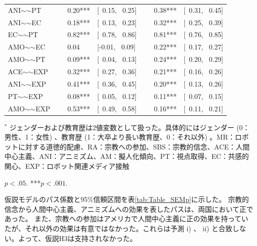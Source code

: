 \documentclass[a4j,12pt]{jreport}
\begin{document}
\begin{table}[H]
{\begin{threeparttable}
\begin{tabular}{@{}lllllll@{}}
ANI$\sim$$\sim$PT                   &  & ~0.20***                     & {[}~0.15, ~0.25{]} &  & ~0.38***                     & {[}~0.31, ~0.45{]} \\
ANI$\sim$$\sim$EC                   &  & ~0.18***                     & {[}~0.13, ~0.23{]} &  & ~0.32***                     & {[}~0.25, ~0.39{]} \\
EC$\sim$$\sim$PT                    &  & ~0.82***                     & {[}~0.78, ~0.86{]} &  & ~0.81***                     & {[}~0.76, ~0.85{]} \\
AMO$\sim$$\sim$EC                   &  & ~0.04                        & {[}-0.01, ~0.09{]}  &  & ~0.22***                     & {[}~0.17, ~0.27{]} \\
AMO$\sim$$\sim$PT                   &  & ~0.09***                     & {[}~0.04, ~0.13{]} &  & ~0.24***                     & {[}~0.20, ~0.29{]} \\
ACE$\sim$$\sim$EXP                  &  & ~0.32***                     & {[}~0.27, ~0.36{]} &  & ~0.21***                     & {[}~0.16, ~0.26{]} \\
ANI$\sim$$\sim$EXP                  &  & ~0.41***                     & {[}~0.36, ~0.45{]} &  & ~0.20***                     & {[}~0.13, ~0.26{]} \\
PT$\sim$$\sim$EXP                   &  & ~0.08***                     & {[}~0.05, ~0.12{]} &  & ~0.11***                     & {[}~0.07, ~0.15{]} \\
AMO$\sim$$\sim$EXP                  &  & ~0.53***                     & {[}~0.49, ~0.58{]} &  & ~0.16***                     & {[}~0.11, ~0.21{]}
\\ \bottomrule
\end{tabular}
    \begin{tablenotes}
      \small
      \item $^{*}$ ジェンダーおよび教育歴は2値変数として扱った。具体的にはジェンダー (0：男性、1：女性) 、教育歴 (1：大卒より長い教育歴、0：それ以外) 。MR：ロボットに対する道徳的配慮、RA：宗教への参加、SBS：宗教的信念、ACE：人間中心主義、ANI：アニミズム、AM：擬人化傾向、PT：視点取得、EC：共感的関心、EXP：ロボット関連メディア接触
      \item *$p < .05$. ***$p < .001$.
    \end{tablenotes}
  \end{threeparttable}
  }
\end{table}

\clearpage


仮説モデルのパス係数と95\%信頼区間を表\ref{tab:Table_SEMp}に示した。
宗教的信念から人間中心主義、アニミズムへの効果を表したパスは、両国において正であった。
また、宗教への参加はアメリカで人間中心主義に正の効果を持っていたが、それ以外の効果は有意ではなかった。これらは予測 i) 、 ii) と合致しない。よって、仮説H3は支持されなかった。
\end{document}
